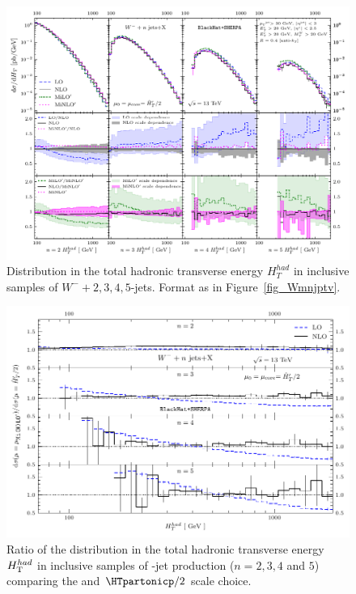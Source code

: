 \begin{figure}[t]

\includegraphics[clip,scale=0.95]{plots/Wmnj-13TeV_anti-kt-R4-Pt30_jets_HT_C}
\caption{Distribution in the total hadronic transverse energy $H_T^{had}$ in inclusive samples
of $W^-+2,3,4,5$-jets. Format as in Figure~\ref{fig_Wmnjptv}.
}
\label{fig_Wmjets_HT}
\end{figure}

\begin{figure}[t]

\includegraphics[clip,scale=1]{plots/rat_Wmnj_MINLO_HT_anti-kt-R4-Pt30_jets_HT_C}
\caption{Ratio of the distribution in the total hadronic transverse energy $H_{\textrm T}^{had}$ in inclusive samples of \Wmjn-jet production ($n=2,3,4$ and $5$) comparing the \MINLOp{} and $\HTpartonicp/2$ scale choice.}
\label{fig_MINLO_HTp_ratios_HT}
\end{figure}



